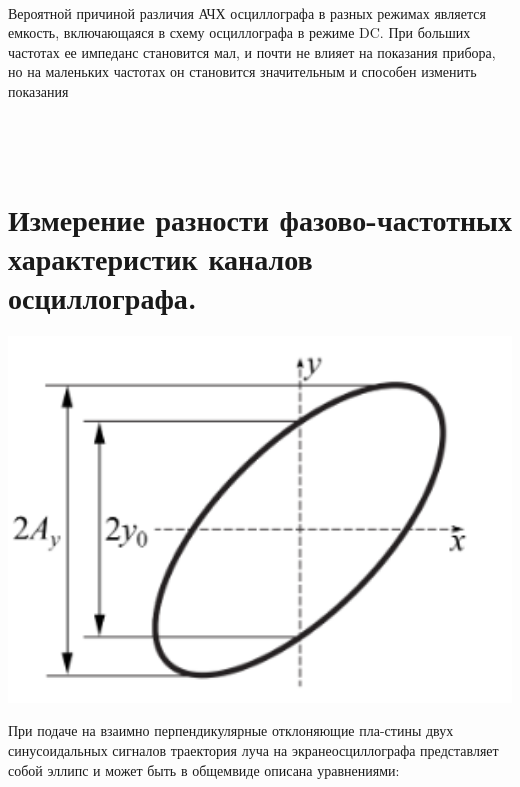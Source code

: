\documentclass{article}
\begin{document}
$\:$

Вероятной причиной различия АЧХ осциллографа в разных режимах является емкость, включающаяся в схему осциллографа в режиме DC. При больших частотах ее импеданс становится мал, и почти не влияет на показания прибора, но на маленьких частотах он становится значительным и способен изменить показания
$\:$

\section{}
$\:$
\section{Измерение разности фазово-частотных характеристик каналов осциллографа.}

\includegraphics[width=1\textwidth]{osci.png}

При подаче на взаимно перпендикулярные отклоняющие пла-стины двух синусоидальных сигналов траектория луча на экранеосциллографа представляет собой эллипс и может быть в общемвиде описана уравнениями:
\end{document}
